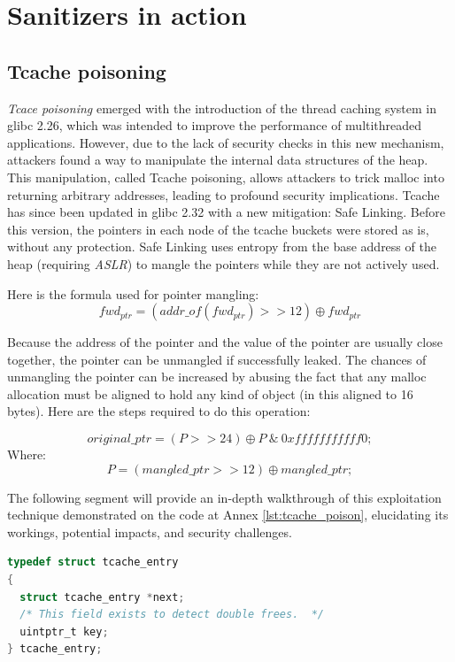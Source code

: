 \documentclass{article}
\begin{document}
\section{Sanitizers in action}
\subsection{Tcache poisoning}
\emph{Tcace poisoning} emerged with the introduction of the thread caching system in glibc 2.26, which was intended to improve the performance of multithreaded applications. However, due to the lack of security checks in this new mechanism, attackers found a way to manipulate the internal data structures of the heap. This manipulation, called Tcache poisoning, allows attackers to trick malloc into returning arbitrary addresses, leading to profound security implications. Tcache has since been updated in glibc 2.32 with a new mitigation: Safe Linking. Before this version, the pointers in each node of the tcache buckets were stored as is, without any protection. Safe Linking uses entropy from the base address of the heap (requiring \emph{ASLR}) to mangle the pointers while they are not actively used. 

Here is the formula used for pointer mangling:
\begin{equation}
    fwd_{ptr} = (addr\_of(fwd_{ptr}) >> 12) \oplus fwd_{ptr}  
\end{equation}

Because the address of the pointer and the value of the pointer are usually close together, the pointer can be unmangled if successfully leaked. The chances of unmangling the pointer can be increased  by abusing the fact that any malloc allocation must be aligned to hold any kind of object (in this aligned to 16 bytes). Here are the steps required to do this operation:

\begin{equation}
     original\_ptr = (P >> 24) \oplus P~\&~0xfffffffffff0;
\end{equation}
Where: 
\begin{equation}
     P = (mangled\_ptr >> 12) \oplus mangled\_ptr;
\end{equation}

The following segment will provide an in-depth walkthrough of this exploitation technique demonstrated on the code at Annex \ref{lst:tcache_poison}, elucidating its workings, potential impacts, and security challenges.
\begin{lstlisting}[language={C},label={lst:entry},caption={\emph{tcache\_entry} struct}]
typedef struct tcache_entry
{
  struct tcache_entry *next;
  /* This field exists to detect double frees.  */
  uintptr_t key;
} tcache_entry;
\end{lstlisting}
\end{document}

